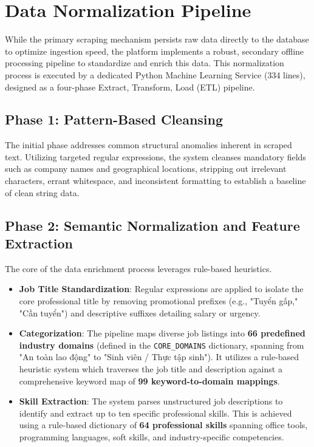 \section{Data Normalization Pipeline}

While the primary scraping mechanism persists raw data directly to the database to optimize ingestion speed, the platform implements a robust, secondary offline processing pipeline to standardize and enrich this data. This normalization process is executed by a dedicated Python Machine Learning Service (334 lines), designed as a four-phase Extract, Transform, Load (ETL) pipeline.

\subsection{Phase 1: Pattern-Based Cleansing}
The initial phase addresses common structural anomalies inherent in scraped text. Utilizing targeted regular expressions, the system cleanses mandatory fields such as company names and geographical locations, stripping out irrelevant characters, errant whitespace, and inconsistent formatting to establish a baseline of clean string data.

\subsection{Phase 2: Semantic Normalization and Feature Extraction}
The core of the data enrichment process leverages rule-based heuristics.
\begin{itemize}
\item \textbf{Job Title Standardization}: Regular expressions are applied to isolate the core professional title by removing promotional prefixes (e.g., "Tuyển gấp," "Cần tuyển") and descriptive suffixes detailing salary or urgency.
\item \textbf{Categorization}: The pipeline maps diverse job listings into \textbf{66 predefined industry domains} (defined in the \texttt{CORE\_DOMAINS} dictionary, spanning from "An toàn lao động" to "Sinh viên / Thực tập sinh"). It utilizes a rule-based heuristic system which traverses the job title and description against a comprehensive keyword map of \textbf{99 keyword-to-domain mappings}.
\item \textbf{Skill Extraction}: The system parses unstructured job descriptions to identify and extract up to ten specific professional skills. This is achieved using a rule-based dictionary of \textbf{64 professional skills} spanning office tools, programming languages, soft skills, and industry-specific competencies.
\end{itemize}

